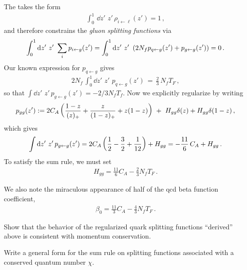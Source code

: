 \begin{example}
    The  takes the form
    \begin{align}
        \int_0^1\,\dd z'\,\, z'\,\rho_{i\leftarrow\ell}(z') = 1
        \,,
    \end{align}
    and therefore constrains the \textit{gluon splitting functions} via
\begin{align}
    \int_0^1 \dd z'
    \,\,
    z'
    \,\,
    \sum_i
    p_{i \leftarrow g}(z')
    =
    \int_0^1 \dd z'
    \,\,
    z'
    \,\,
    \left(
        2 N_f p_{q \leftarrow g}(z')
        +
        p_{g\leftarrow g}(z')
    \right)
    = 0
    \,.
\end{align}
%
Our known expression for \(p_{q\leftarrow g}\) gives
\begin{align}
    2 N_f \,\int_0^1 \dd z'\,\, z'\,\, p_{q \leftarrow g}(z')
    \,
    =
    \,
    \frac{2}{3}\,N_f T_F
    \,,
\end{align}
so that \(\int \dd z'\,\, z'\,p_{g\leftarrow g}(z') = -2/3 N_f T_f \).
%
Now we explicitly regularize by writing
\begin{align}
    p_{gg}(z')
    :=
    2 C_A \left(
        \frac{1-z}{(z)_+} + \frac{z}{(1-z)_+} + z(1-z)
    \right)
    \,\,
    +
    \,\,
    H_{gg}\delta(z) + H_{gg} \delta(1-z)
    \,,
\end{align}
which gives
\begin{align}
    \int \dd z'\,\, z'\,p_{g\leftarrow g}(z')
    =
    2 C_A \left(\frac{1}{2} - \frac{3}{2} + \frac{1}{12}\right)
    +
    H_{gg}
    =
    -\frac{11}{6}\,C_A + H_{gg}
    \,.
\end{align}
To satisfy the sum rule, we must set
\begin{align}
    H_{gg} = \frac{11}{6} C_A - \frac{2}{3} N_f T_F
    \,.
\end{align}

We also note the miraculous appearance of half of the \gls{qcd} beta function coefficient,
\begin{align}
    \beta_0 = \frac{11}{3} C_A - \frac{4}{3}N_f T_F
    \,.
\end{align}
\end{example}

\begin{exercise}
    Show that the behavior of the regularized quark splitting functions ``derived'' above is consistent with momentum conservation.
\end{exercise}

\begin{exercise}
    Write a general form for the sum rule on splitting functions associated with a conserved quantum number \(\chi\).
\end{exercise}




